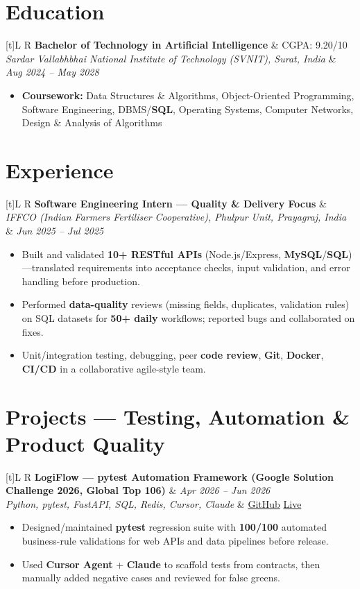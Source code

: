 \documentclass[a4paper,10pt]{article}
\newcommand{\resumeSubheading}[4]{%
  \vspace{0.3mm}
  \noindent
  \begin{tabularx}{\textwidth}[t]{L R}
    \textbf{#1} & #4 \\
    \textit{#3} & \textit{#2} \\
  \end{tabularx}
  \vspace{-0.3mm}%
}
\newcommand{\resumeProject}[4]{%
  \vspace{0.3mm}
  \noindent
  \begin{tabularx}{\textwidth}[t]{L R}
    \textbf{#1} & \textit{#3} \\
    \textit{#2} & #4 \\
  \end{tabularx}
  \vspace{-0.3mm}%
}
\begin{document}
\section{Education}
\small
\resumeSubheading
  {Bachelor of Technology in Artificial Intelligence}{Aug 2024 -- May 2028}
  {Sardar Vallabhbhai National Institute of Technology (SVNIT), Surat, India}{CGPA: 9.20/10}
\begin{itemize}
  \item \textbf{Coursework:} Data Structures \& Algorithms, Object-Oriented Programming, Software Engineering, DBMS/\textbf{SQL}, Operating Systems, Computer Networks, Design \& Analysis of Algorithms
\end{itemize}

\section{Experience}
\small
\resumeSubheading
  {Software Engineering Intern --- Quality \& Delivery Focus}{Jun 2025 -- Jul 2025}
  {IFFCO (Indian Farmers Fertiliser Cooperative), Phulpur Unit, Prayagraj, India}{}
\begin{itemize}
  \item Built and validated \textbf{10+ RESTful APIs} (Node.js/Express, \textbf{MySQL}/\textbf{SQL})---translated requirements into acceptance checks, input validation, and error handling before production.
  \item Performed \textbf{data-quality} reviews (missing fields, duplicates, validation rules) on SQL datasets for \textbf{50+ daily} workflows; reported bugs and collaborated on fixes.
  \item Unit/integration testing, debugging, peer \textbf{code review}, \textbf{Git}, \textbf{Docker}, \textbf{CI/CD} in a collaborative agile-style team.
\end{itemize}

\section{Projects --- Testing, Automation \& Product Quality}
\small

\resumeProject
  {LogiFlow --- pytest Automation Framework (Google Solution Challenge 2026, Global Top 106)}
  {Python, pytest, FastAPI, SQL, Redis, Cursor, Claude}
  {Apr 2026 -- Jun 2026}
  {\href{https://github.com/Ojas-Srivastava05/LogiFlow-Solution-Challenge-2026}{GitHub} \textbar{} \href{https://logi-flow-solution-challenge-2026.vercel.app}{Live}}
\begin{itemize}
  \item Designed/maintained \textbf{pytest} regression suite with \textbf{100/100} automated business-rule validations for web APIs and data pipelines before release.
  \item Used \textbf{Cursor Agent} + \textbf{Claude} to scaffold tests from contracts, then manually added negative cases and reviewed for false greens.
\end{itemize}
\end{document}
